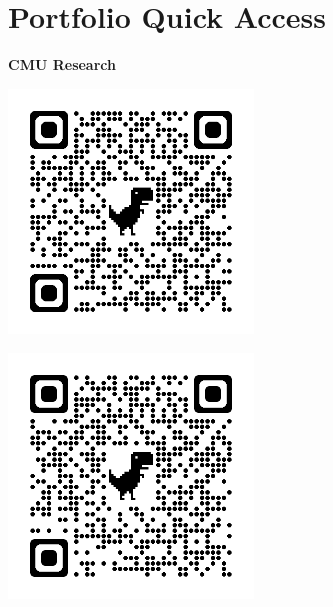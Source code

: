 \documentclass[letterpaper,10pt]{article}
\newcommand{\qrheader}[1]{
  \begin{center}
    \vspace{0.5cm}
    \textbf{#1}
  \end{center}
}
\begin{document}
\section{Portfolio Quick Access}

  \begin{center}
    \qrheader{CMU Research}
    \begin{minipage}{0.45\textwidth}
        \centering
        \includegraphics[width=6.5cm, height=6.5cm]{Figures/Zoe.png}
        \label{fig:image1}
    \end{minipage}
    \hspace{0.05\textwidth}
    \begin{minipage}{0.45\textwidth}
        \centering
        \includegraphics[width=6.5cm, height=6.5cm]{Figures/HUMRS.png}
        \label{fig:image2}
    \end{minipage}
    \vspace{0.1cm} %
  \end{center}
\end{document}
